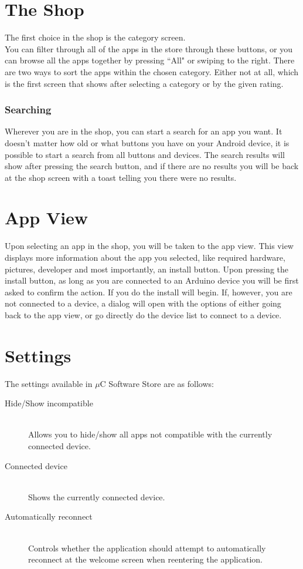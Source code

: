 \chapter{The Shop}
The first choice in the shop is the category screen.\\
You can filter through all of the apps in the store through these buttons, or you can browse all the apps together by pressing ``All" or swiping to the right. There are two ways to sort the apps within the chosen category. Either not at all, which is the first screen that shows after selecting a category or by the given rating. \\

\subsection{Searching}
Wherever you are in the shop, you can start a search for an app you want. It doesn't matter how old or what buttons you have on your Android device, it is possible to start a search from all buttons and devices. The search results will show after pressing the search button, and if there are no results you will be back at the shop screen with a toast telling you there were no results.

\chapter{App View}
Upon selecting an app in the shop, you will be taken to the app view. This view displays more information about the app you selected, like required hardware, pictures, developer and most importantly, an install button. 
Upon pressing the install button, as long as you are connected to an Arduino device you will be first asked to confirm the action. If you do the install will begin. If, however, you are not connected to a device, a dialog will open with the options of either going back to the app view, or go directly do the device list to connect to a device.

\chapter{Settings}
The settings available in $\mu$C Software Store are as follows:

\begin{description}
	\item[Hide/Show incompatible] \hfill \\
		Allows you to hide/show all apps not compatible with the currently connected device.
	\item[Connected device] \hfill \\
		Shows the currently connected device. 
	\item[Automatically reconnect] \hfill \\
		 Controls whether the application should attempt to automatically reconnect at the welcome screen when reentering the application.
\end{description}